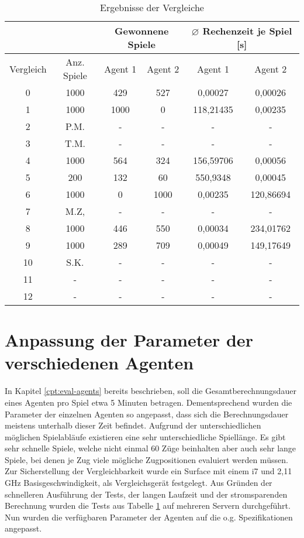 \begin{table}[ht]
\begin{center}
\begin{tabular}{| c | c | c | c | c | c |} \hline
\multicolumn{2}{|c|}{}  & \multicolumn{2}{|c|}{Gewonnene Spiele} & \multicolumn{2}{|c|}{$\varnothing$ Rechenzeit je Spiel [s]} \\ \hline
Vergleich & Anz. Spiele & Agent 1 & Agent 2 & Agent 1 & Agent 2 \\ \hline
\hline
 0 & 1000 & 429  &  527 &   0,00027 &   0,00026 \\ \hline
 \hline
 1 & 1000 & 1000 &    0 & 118,21435 &   0,00235 \\ \hline
 2 & P.M.   & -    & -    & -         & -         \\ \hline
 3 & T.M. & -    & -    & -         & -         \\ \hline
 4 & 1000 &  564 &  324 & 156,59706 &   0,00056 \\ \hline
 5 & 200 & 132   & 60   & 550,9348  & 0,00045   \\ \hline
 \hline
 6 & 1000 &    0 & 1000 &   0,00235 & 120,86694 \\ \hline
 7 & M.Z, & -    & -    & -         & -         \\ \hline
 8 & 1000 &  446 &  550 &   0,00034 & 234,01762 \\ \hline
 9 & 1000 &  289 &  709 &   0,00049 & 149,17649 \\ \hline
10 & S.K. & -    & -    & -         & -         \\ \hline
\hline
11 & -    & -    & -    & -         & -         \\ \hline
12 & -    & -    & -    & -         & -         \\ \hline
\end{tabular}
\end{center}
\caption{Ergebnisse der Vergleiche}
\label{tbl:cmp-results}
\end{table}
\newpage
\section{Anpassung der Parameter der verschiedenen Agenten}
In Kapitel \ref{cpt:eval-agents} bereits beschrieben, soll die Gesamtberechnungsdauer eines Agenten pro Spiel etwa 5 Minuten betragen. Dementsprechend wurden die Parameter der einzelnen Agenten so angepasst, dass sich die Berechnungsdauer meistens unterhalb dieser Zeit befindet. Aufgrund der unterschiedlichen möglichen Spielabläufe existieren eine sehr unterschiedliche Spiellänge. Es gibt sehr schnelle Spiele, welche nicht einmal 60 Züge beinhalten aber auch sehr lange Spiele, bei denen je Zug viele mögliche Zugpositionen evaluiert werden müssen. Zur Sicherstellung der Vergleichbarkeit wurde ein Surface mit einem i7 und 2,11 GHz Basisgeschwindigkeit, als Vergleichsgerät festgelegt. Aus Gründen der schnelleren Ausführung der Tests, der langen Laufzeit und der stromsparenden Berechnung wurden die Tests aus Tabelle \ref{tbl:cmp-results} auf mehreren Servern durchgeführt.
\\Nun wurden die verfügbaren Parameter der Agenten auf die o.g. Spezifikationen angepasst.
